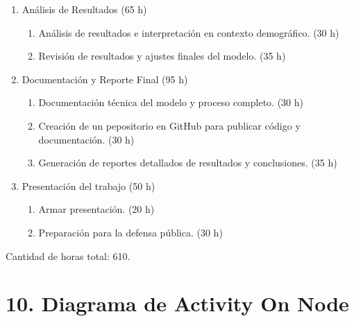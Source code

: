 \documentclass[
11pt, %
]{charter}
\begin{document}
\begin{enumerate}
	\item Análisis de Resultados (65 h)
	\begin{enumerate}
		\item Análisis de resultados e interpretación en contexto demográfico. (30 h)
		\item Revisión de resultados y ajustes finales del modelo. (35 h)
	\end{enumerate}
	
	\item Documentación y Reporte Final (95 h)
	\begin{enumerate}
		\item Documentación técnica del modelo y proceso completo. (30 h)
		\item Creación de un pepositorio en GitHub para publicar código y documentación. (30 h)
		\item Generación de reportes detallados de resultados y conclusiones. (35 h)
	\end{enumerate}

	\item Presentación del trabajo (50 h)
		\begin{enumerate}
			\item Armar presentación. (20 h)
			\item Preparación para la defensa pública. (30 h)
		\end{enumerate}
		
\end{enumerate}

Cantidad de horas total: 610.

%
%
%
%



\section{10. Diagrama de Activity On Node}
\label{sec:AoN}
\end{document}
